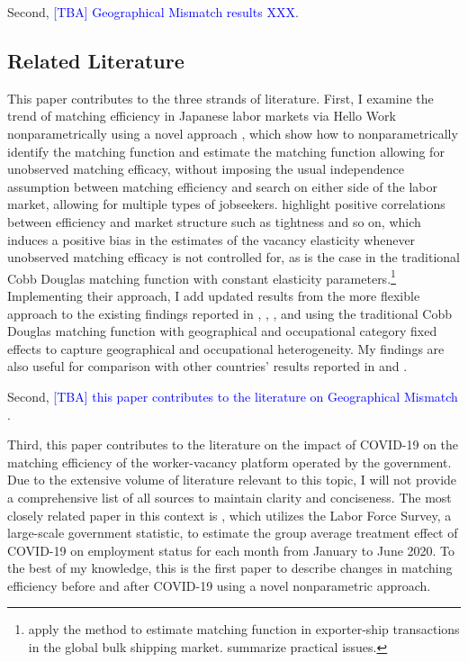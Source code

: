 \documentclass[12pt]{article}
\begin{document}
Second, \textcolor{blue}{[TBA] Geographical Mismatch results XXX}.


\subsection{Related Literature}
This paper contributes to the three strands of literature.
First, I examine the trend of matching efficiency in Japanese labor markets via Hello Work nonparametrically using a novel approach \citep{lange2020beyond}, which show how to nonparametrically identify the matching function and estimate the matching function allowing for unobserved matching efficacy, without imposing the usual independence assumption between matching efficiency and search on either side of the labor market, allowing for multiple types of jobseekers.
\cite{lange2020beyond} highlight positive correlations between efficiency and market structure such as tightness and so on, which induces a positive bias in the estimates of the vacancy elasticity whenever unobserved matching efficacy is not controlled for, as is the case in the traditional Cobb Douglas matching function with constant elasticity parameters.\footnote{\cite{brancaccio2020geography,brancaccio2023search} apply the method to estimate matching function in exporter-ship transactions in the global bulk shipping market. \cite{brancaccio2020guide} summarize practical issues.} 
Implementing their approach, I add updated results from the more flexible approach to the existing findings reported in \cite{kano2005estimating}, \cite{kambayashi2006vacancy}, \cite{sasaki2008matching}, and \cite{higashi2018spatial} using the traditional Cobb Douglas matching function with geographical and occupational category fixed effects to capture geographical and occupational heterogeneity.
My findings are also useful for comparison with other countries' results reported in \cite{bernstein2022matching} and \cite{petrongolo2001looking}.

Second, \textcolor{blue}{[TBA] this paper contributes to the literature on Geographical Mismatch \cite{csahin2014mismatch,kawata2016multi,kawata2019}}.

Third, this paper contributes to the literature on the impact of COVID-19 on the matching efficiency of the worker-vacancy platform operated by the government. 
Due to the extensive volume of literature relevant to this topic, I will not provide a comprehensive list of all sources to maintain clarity and conciseness. 
The most closely related paper in this context is \cite{fukai2021describing}, which utilizes the Labor Force Survey, a large-scale government statistic, to estimate the group average treatment effect of COVID-19 on employment status for each month from January to June 2020. 
To the best of my knowledge, this is the first paper to describe changes in matching efficiency before and after COVID-19 using a novel nonparametric approach.
\end{document}
